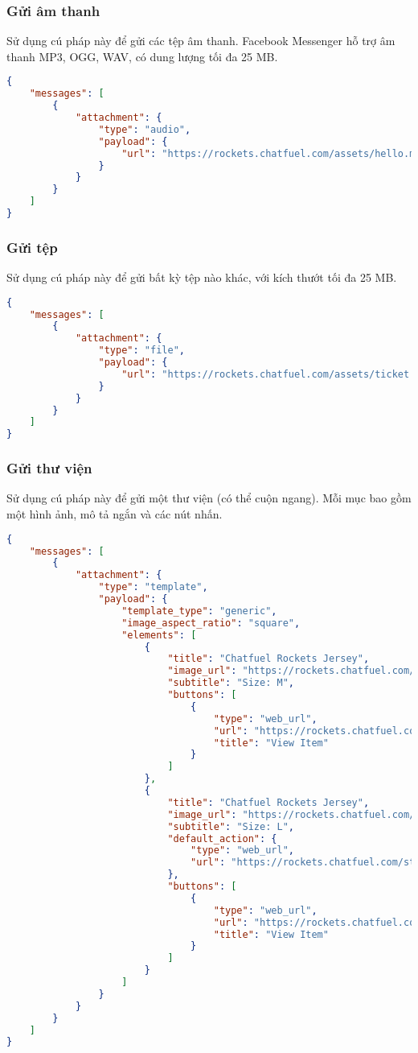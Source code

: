 \subsubsection{Gửi âm thanh}
Sử dụng cú pháp này để gửi các tệp âm thanh. Facebook Messenger hỗ trợ âm thanh MP3, OGG, WAV, có dung lượng tối đa 25 MB.
\begin{lstlisting}[language=json]
{
	"messages": [
		{
			"attachment": {
				"type": "audio",
				"payload": {
					"url": "https://rockets.chatfuel.com/assets/hello.mp3"
				}
			}
		}
	]
}
\end{lstlisting}\par

\subsubsection{Gửi tệp}
Sử dụng cú pháp này để gửi bất kỳ tệp nào khác, với kích thướt tối đa 25 MB.
\begin{lstlisting}[language=json]
{
	"messages": [
		{
			"attachment": {
				"type": "file",
				"payload": {
					"url": "https://rockets.chatfuel.com/assets/ticket.pdf"
				}
			}
		}
	]
}
\end{lstlisting}\par

\subsubsection{Gửi thư viện}
Sử dụng cú pháp này để gửi một thư viện (có thể cuộn ngang). Mỗi mục bao gồm một hình ảnh, mô tả ngắn và các nút nhấn.
\begin{lstlisting}[language=json]
{
	"messages": [
		{
			"attachment": {
				"type": "template",
				"payload": {
					"template_type": "generic",
					"image_aspect_ratio": "square",
					"elements": [
						{
							"title": "Chatfuel Rockets Jersey",
							"image_url": "https://rockets.chatfuel.com/assets/shirt.jpg",
							"subtitle": "Size: M",
							"buttons": [
								{
									"type": "web_url",
									"url": "https://rockets.chatfuel.com/store",
									"title": "View Item"
								}
							]
						},
						{
							"title": "Chatfuel Rockets Jersey",
							"image_url": "https://rockets.chatfuel.com/assets/shirt.jpg",
							"subtitle": "Size: L",
							"default_action": {
								"type": "web_url",
								"url": "https://rockets.chatfuel.com/store"
							},
							"buttons": [
								{
									"type": "web_url",
									"url": "https://rockets.chatfuel.com/store",
									"title": "View Item"
								}
							]
						}
					]
				}
			}
		}
	]
}
\end{lstlisting}\par

